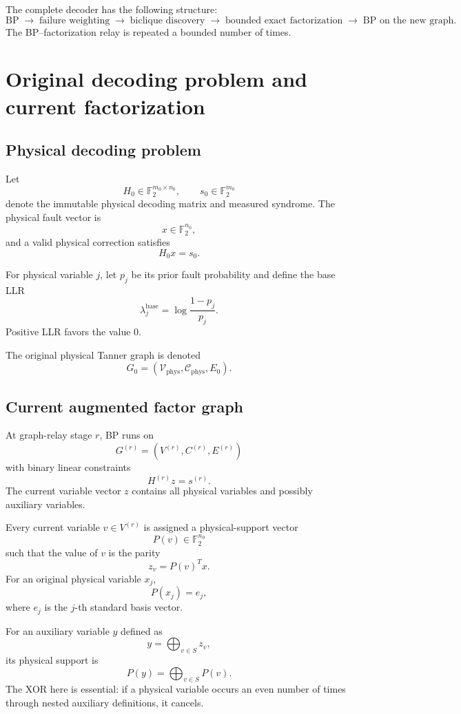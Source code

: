 \documentclass[11pt,a4paper]{article}
\newcommand{\Ftwo}{\mathbb F_2}
\newcommand{\Vphys}{\mathcal V_{\mathrm{phys}}}
\newcommand{\Cphys}{\mathcal C_{\mathrm{phys}}}
\begin{document}
The complete decoder has the following structure:
\[
\boxed{
\text{BP}
\;\longrightarrow\;
\text{failure weighting}
\;\longrightarrow\;
\text{biclique discovery}
\;\longrightarrow\;
\text{bounded exact factorization}
\;\longrightarrow\;
\text{BP on the new graph}.
}
\]
The BP--factorization relay is repeated a bounded number of times.

\section{Original decoding problem and current factorization}

\subsection{Physical decoding problem}

Let
\[
H_0\in\Ftwo^{m_0\times n_0},\qquad
s_0\in\Ftwo^{m_0}
\]
denote the immutable physical decoding matrix and measured syndrome. The
physical fault vector is
\[
x\in\Ftwo^{n_0},
\]
and a valid physical correction satisfies
\[
H_0x=s_0.
\]

For physical variable $j$, let $p_j$ be its prior fault probability and
define the base LLR
\[
\lambda_j^{\mathrm{base}}
=
\log\frac{1-p_j}{p_j}.
\]
Positive LLR favors the value $0$.

The original physical Tanner graph is denoted
\[
G_0=(\Vphys,\Cphys,E_0).
\]

\subsection{Current augmented factor graph}

At graph-relay stage $r$, BP runs on
\[
G^{(r)}=(V^{(r)},C^{(r)},E^{(r)})
\]
with binary linear constraints
\[
H^{(r)}z=s^{(r)}.
\]
The current variable vector $z$ contains all physical variables and possibly
auxiliary variables.

Every current variable $v\in V^{(r)}$ is assigned a physical-support vector
\[
P(v)\in\Ftwo^{n_0}
\]
such that the value of $v$ is the parity
\[
z_v=P(v)^Tx.
\]
For an original physical variable $x_j$,
\[
P(x_j)=e_j,
\]
where $e_j$ is the $j$-th standard basis vector.

For an auxiliary variable $y$ defined as
\[
y=\bigoplus_{v\in S} z_v,
\]
its physical support is
\[
P(y)=\bigoplus_{v\in S}P(v).
\]
The XOR here is essential: if a physical variable occurs an even number of
times through nested auxiliary definitions, it cancels.
\end{document}
